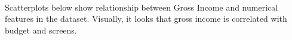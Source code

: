\documentclass[11pt]{article}
\begin{document}
    \begin{center}
    \end{center}
    { \hspace*{\fill} \\}
    
    \begin{center}
    \end{center}
    { \hspace*{\fill} \\}
    
    \begin{center}
    \end{center}
    { \hspace*{\fill} \\}
    
    \begin{center}
    \end{center}
    { \hspace*{\fill} \\}
    
    \begin{center}
    \end{center}
    { \hspace*{\fill} \\}
    
    \begin{center}
    \end{center}
    { \hspace*{\fill} \\}
    
    Scatterplots below show relationship between Gross Income and numerical
features in the dataset. Visually, it looks that gross income is
correlated with budget and screens.
\end{document}
